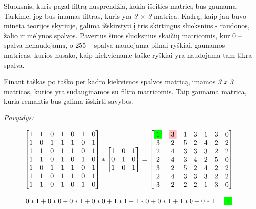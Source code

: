 \documentclass{VUMIFInfKursinis}
\begin{document}
Sluoksnis, kuris pagal filtrą nusprendžia, kokia išeities matricą bus gaunama. Tarkime, jog bus imamas filtras, kuris yra \textit{3 $\times$ 3} matrica. Kadrą, kaip jau buvo minėta teorijos skyriuje, galima išskirstyti į tris skirtingus sluoksnius - raudonos, žalio ir mėlynos spalvos. Pavertus šiuos sluoksnius skaičių matricomis, kur 0 – spalva nenaudojama, o 255 – spalva naudojama pilnai ryškiai, gaunamos matricas, kurios nusako, kaip kiekviename taške ryškiai yra naudojama tam tikra spalva.

Einant taškas po taško per kadro kiekvienos spalvos matricą, imamos \textit{3 x 3} matricos, kurios yra sudauginamos su filtro matricomis. Taip gaunama matrica, kuria remantis bus galima išskirti savybes.

\textit{Pavyzdys:}

\begin{equation}\label{eq:convl}
	\begin{bmatrix}
	1 & 1 & 0 & 1 & 0 & 1 & 0 \\
	1 & 0 & 1 & 1 & 1 & 0 & 1 \\
	1 & 1 & 0 & 1 & 1 & 0 & 1 \\
	1 & 1 & 0 & 1 & 0 & 1 & 0 \\
	1 & 0 & 1 & 1 & 1 & 0 & 1 \\
	1 & 1 & 0 & 1 & 1 & 0 & 1 \\
	1 & 1 & 0 & 1 & 0 & 1 & 0
	\end{bmatrix}
	*
	\begin{bmatrix}
	1 & 0 & 1 \\
	0 & 1 & 0 \\
	1 & 0 & 1
	\end{bmatrix}
	=
	\begin{bmatrix}
	\colorbox{green}{1} & \colorbox{pink}{3} & 1 & 3 & 1 & 3 & 0 \\
	3 & 2 & 5 & 2 & 4 & 2 & 2 \\
	2 & 4 & 3 & 3 & 3 & 2 & 2 \\
	2 & 4 & 3 & 4 & 2 & 5 & 0 \\
	3 & 2 & 5 & 2 & 4 & 2 & 2 \\
	2 & 4 & 3 & 3 & 3 & 2 & 2 \\
	3 & 2 & 2 & 2 & 1 & 3 & 0
	\end{bmatrix}
\end{equation}

\begin{equation}\label{eq:convl1}
0*1+0*0+0*1+0*0+1*1+1*0+0*1+1*0+0*1=\colorbox{green}{1}
\end{equation}
\end{document}
